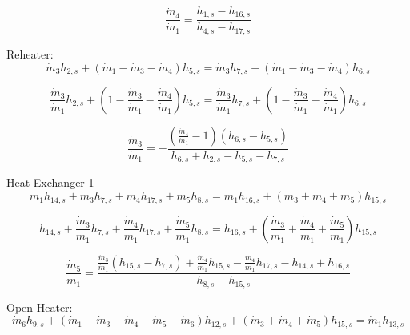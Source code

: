 \documentclass{article}
\begin{document}
\begin{equation}
\frac{\dot{m}_{4}}{\dot{m}_{1}} = \frac{h_{1,s} - h_{16,s}}{h_{4,s} - h_{17,s}}
\end{equation}


Reheater:
\begin{equation}
\dot{m}_{ 3}h_{ 2,s} + (\dot{m}_{ 1} - \dot{m}_{ 3} - \dot{m}_{ 4})h_{ 5,s} = \dot{m}_{ 3}h_{ 7,s} + (\dot{m}_{ 1} - \dot{m}_{ 3} - \dot{m}_{ 4})h_{ 6,s}
\end{equation}

\begin{equation}
\frac{\dot{m}_{ 3}}{\dot{m}_{ 1}}h_{ 2,s} + (1 - \frac{\dot{m}_{ 3}}{\dot{m}_{ 1}} - \frac{\dot{m}_{ 4}}{\dot{m}_{ 1}})h_{ 5,s} = \frac{\dot{m}_{ 3}}{\dot{m}_{ 1}}h_{ 7,s} + (1 - \frac{\dot{m}_{ 3}}{\dot{m}_{ 1}} - \frac{\dot{m}_{ 4}}{\dot{m}_{ 1}})h_{ 6,s}
\end{equation}

\begin{equation}
\frac{\dot{m}_{3}}{\dot{m}_{1}} = -\frac{(\frac{\dot{m}_{4}}{\dot{m}_{ 1}} - 1)(h_{6,s} - h_{5,s})}{h_{6,s} + h_{2,s} - h_{5,s} - h_{7,s}}
\end{equation}


Heat Exchanger 1
\begin{equation}
\dot{m}_{ 1}h_{14,s} + \dot{m}_{ 3}h_{ 7,s} + \dot{m}_{ 4}h_{17,s} + \dot{m}_{ 5}h_{ 8,s} = \dot{m}_{ 1}h_{16,s} + (\dot{m}_{ 3} + \dot{m}_{ 4} + \dot{m}_{ 5})h_{15,s}
\end{equation}

\begin{equation}
h_{14,s} + \frac{\dot{m}_{ 3}}{\dot{m}_{ 1}}h_{ 7,s} + \frac{\dot{m}_{ 4}}{\dot{m}_{ 1}}h_{17,s} + \frac{\dot{m}_{ 5}}{\dot{m}_{ 1}}h_{ 8,s} = h_{16,s} + (\frac{\dot{m}_{ 3}}{\dot{m}_{ 1}} + \frac{\dot{m}_{ 4}}{\dot{m}_{ 1}} + \frac{\dot{m}_{ 5}}{\dot{m}_{ 1}})h_{15,s}
\end{equation}

\begin{equation}
\frac{\dot{m}_{5}}{\dot{m}_{1}} = \frac{\frac{\dot{m}_{3}}{\dot{m}_{1}}(h_{15,s} - h_{7,s}) + \frac{\dot{m}_{4}}{\dot{m}_{1}}h_{15,s} - \frac{\dot{m}_{4}}{\dot{m}_{1}}h_{17,s} - h_{14,s} + h_{16,s}}{h_{8,s} - h_{15,s}}
\end{equation}


Open Heater:
\begin{equation}
\dot{m}_{ 6}h_{ 9,s} + (\dot{m}_{ 1} - \dot{m}_{ 3} - \dot{m}_{ 4} - \dot{m}_{ 5} - \dot{m}_{ 6})h_{12,s} + (\dot{m}_{ 3} + \dot{m}_{ 4} + \dot{m}_{ 5})h_{15,s} = \dot{m}_{ 1}h_{13,s}
\end{equation}
\end{document}
